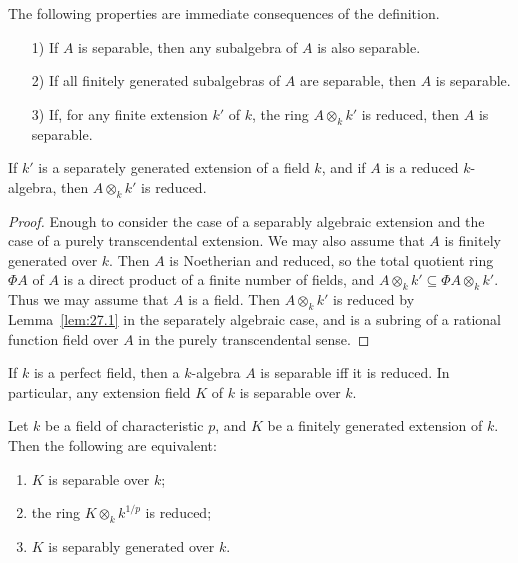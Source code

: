 \documentclass[../main]{subfiles}
\begin{document}
The following properties are immediate consequences of the definition. 

\begin{enumerate}
    \item[1)] If $A$ is separable, then any subalgebra of $A$ is also separable.
    \item[2)] If all finitely generated subalgebras of $A$ are separable, then $A$ is separable.
    \item[3)] If, for any finite extension $k'$ of $k$, the ring $A \otimes_k k'$ is reduced, then $A$ is separable. 
\end{enumerate}

\begin{parlemma}
\label{lem:27.2}
If $k'$ is a separately generated extension of a field $k$, and if $A$ is a reduced $k$-algebra, then $A \otimes_k k'$ is reduced.
\end{parlemma}

\begin{proof}
Enough to consider the case of a separably algebraic extension and the case of a purely transcendental extension. We may also assume that $A$ is finitely generated over $k$. Then $A$ is Noetherian and reduced, so the total quotient ring $\Phi A$ of $A$ is a direct product of a finite number of fields, and $A \otimes_k k' \subseteq \Phi A \otimes_k k'$. Thus we may assume that $A$ is a field. Then $A \otimes_k k'$ is reduced by Lemma~\ref{lem:27.1} in the separately algebraic case, and is a subring of a rational function field over $A$ in the purely transcendental sense. 
\end{proof}

\begin{corollary}
If $k$ is a perfect field, then a $k$-algebra $A$ is separable iff it is reduced. In particular, any extension field $K$ of $k$ is separable over $k$. 
\end{corollary}

\begin{lemma}
\label{lem:27.3}
Let $k$ be a field of characteristic $p$, and $K$ be a finitely generated extension of $k$. Then the following are equivalent: 

\begin{enumerate}[label = (\arabic*)]
    \item $K$ is separable over $k$;
    \item the ring $K \otimes_k k^{1/p}$ is reduced;
    \item $K$ is separably generated over $k$. 
\end{enumerate}
\end{lemma}
\end{document}
